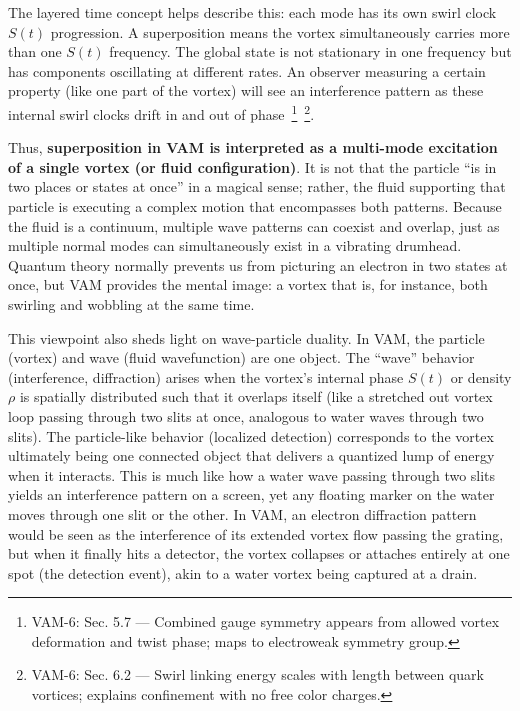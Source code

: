 \documentclass[a4paper,12pt]{article}
\begin{document}
    The layered time concept helps describe this: each mode has its own swirl clock $S(t)$ progression. A superposition means the vortex simultaneously carries more than one $S(t)$ frequency. The global state is not stationary in one frequency but has components oscillating at different rates. An observer measuring a certain property (like one part of the vortex) will see an interference pattern as these internal swirl clocks drift in and out of phase~\footnote{VAM-6: Sec. 5.7 — Combined gauge symmetry appears from allowed vortex deformation and twist phase; maps to electroweak symmetry group.}~\footnote{VAM-6: Sec. 6.2 — Swirl linking energy scales with length between quark vortices; explains confinement with no free color charges.}.

    Thus, \textbf{superposition in VAM is interpreted as a multi-mode excitation of a single vortex (or fluid configuration)}. It is not that the particle “is in two places or states at once” in a magical sense; rather, the fluid supporting that particle is executing a complex motion that encompasses both patterns. Because the fluid is a continuum, multiple wave patterns can coexist and overlap, just as multiple normal modes can simultaneously exist in a vibrating drumhead. Quantum theory normally prevents us from picturing an electron in two states at once, but VAM provides the mental image: a vortex that is, for instance, both swirling and wobbling at the same time.

    This viewpoint also sheds light on wave-particle duality. In VAM, the particle (vortex) and wave (fluid wavefunction) are one object. The “wave” behavior (interference, diffraction) arises when the vortex’s internal phase $S(t)$ or density $\rho$ is spatially distributed such that it overlaps itself (like a stretched out vortex loop passing through two slits at once, analogous to water waves through two slits). The particle-like behavior (localized detection) corresponds to the vortex ultimately being one connected object that delivers a quantized lump of energy when it interacts. This is much like how a water wave passing through two slits yields an interference pattern on a screen, yet any floating marker on the water moves through one slit or the other. In VAM, an electron diffraction pattern would be seen as the interference of its extended vortex flow passing the grating, but when it finally hits a detector, the vortex collapses or attaches entirely at one spot (the detection event), akin to a water vortex being captured at a drain.
\end{document}
